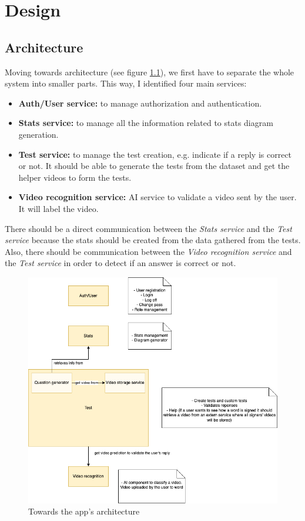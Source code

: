 \chapter{Design}

\section{Architecture}
Moving towards architecture (see figure \ref{fig:design_architecture_first}), we first have to separate the whole system into smaller parts.
This way, I identified four main services: 
\begin{itemize}[noitemsep]
    \item \textbf{Auth/User service:} to manage authorization and authentication.
    \item \textbf{Stats service:} to manage all the information related to stats diagram generation. 
    \item \textbf{Test service:} to manage the test creation, e.g. indicate if a reply is correct or not. It should be able to generate the tests from the dataset and get the helper videos to form the tests.
    \item \textbf{Video recognition service:} AI service to validate a video sent by the user. It will label the video.
\end{itemize}

There should be a direct communication between the \textit{Stats service} and the \textit{Test service} because the stats should be created from the data gathered from the tests. \\
Also, there should be communication between the \textit{Video recognition service} and the \textit{Test service} in order to detect if an answer is correct or not. \\

\begin{figure}[H]
    \centering
        \includegraphics[width=\textwidth]{assets/diagrams/services.png}
    \caption{Towards the app's architecture}
    \label{fig:design_architecture_first}
\end{figure}

